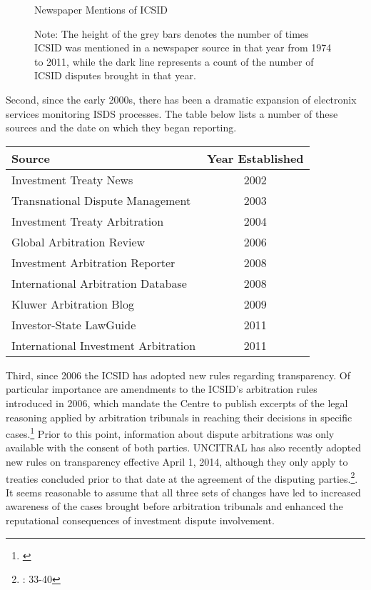\documentclass[12pt,onesided]{amsart}
\begin{document}
\begin{figure}[ht]
	\vspace{4cm}
	\centering
	\caption{Newspaper Mentions of ICSID}
	\label{fig:icsidMedia}
	\resizebox{1\textwidth}{!}{}
	\caption*{Note: The height of the grey bars denotes the number of times ICSID was mentioned in a newspaper source in that year from 1974 to 2011, while the dark line represents a count of the number of ICSID disputes brought in that year.}
\end{figure}

Second, since the early 2000s, there has been a dramatic expansion of electronix services monitoring ISDS processes. The table below lists a number of these sources and the date on which they began reporting. 

\begin{table}[ht]
\centering
\begin{tabular}{lc}
	\hline\hline
	Source & Year Established \\
	\hline
	Investment Treaty News & 2002 \\
	Transnational Dispute Management & 2003 \\
	Investment Treaty Arbitration & 2004 \\
	Global Arbitration Review & 2006 \\
	Investment Arbitration Reporter & 2008 \\
	International Arbitration Database & 2008 \\
	Kluwer Arbitration Blog & 2009 \\
	Investor-State LawGuide & 2011 \\
	International Investment Arbitration & 2011 \\
	\hline\hline
\end{tabular}
\end{table}

Third, since 2006 the ICSID has adopted new rules regarding transparency. Of particular importance are amendments to the ICSID's arbitration rules introduced in 2006, which mandate the Centre to publish excerpts of the legal reasoning applied by arbitration tribunals in reaching their decisions in specific cases.\footnote{\citet{yackee20112006,antonietti:2006}} Prior to this point, information about dispute arbitrations was only available with the consent of both parties. UNCITRAL has also recently adopted new rules on transparency effective April 1, 2014, although they only apply to treaties concluded prior to that date at the agreement of the disputing parties.\footnote{\citet{uncitral:2013}: 33-40 }. It seems reasonable to assume that all three sets of changes have led to increased awareness of the cases brought before arbitration tribunals and enhanced the reputational consequences of investment dispute involvement.
\end{document}
